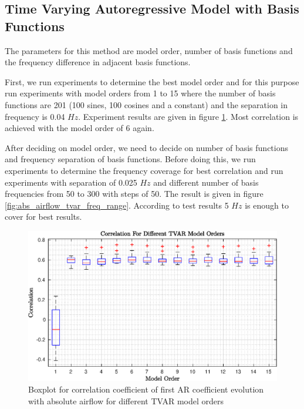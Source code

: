\subsection{Time Varying Autoregressive Model with Basis Functions}
The parameters for this method are model order, number of basis functions and the frequency difference in adjacent basis functions. \par 
First, we run experiments to determine the best model order and for this purpose run experiments with model orders from 1 to 15 where the number of basis functions are 201 (100 sines, 100 cosines and a constant) and the separation in frequency is 0.04 $Hz$. Experiment results are given in figure \ref{fig:abs_airflow_tvar_model_order}. Most correlation is achieved with the model order of 6 again. \par
After deciding on model order, we need to decide on number of basis functions and frequency separation of basis functions. Before doing this, we run experiments to determine the frequency coverage for best correlation and run experiments with separation of 0.025 $Hz$ and different number of basis frequencies from 50 to 300 with steps of 50. The result is given in figure \ref{fig:abs_airflow_tvar_freq_range}. According to test results 5 $Hz$ is enough to cover for best results.
\begin{figure}
	\begin{center}
		\includegraphics[width=\textwidth]{figures/corr_abs_for_tvar_ar_order_selection.eps}
		\caption{Boxplot for correlation coefficient of first AR coefficient evolution with absolute airflow for different TVAR model orders}
		\label{fig:abs_airflow_tvar_model_order}
	\end{center}
\end{figure}
